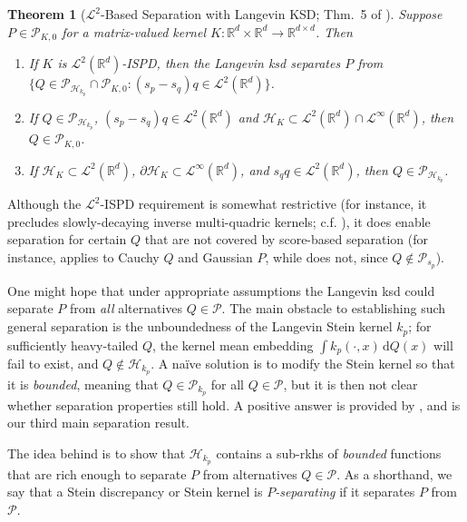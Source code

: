 \documentclass[12pt,paper=letter]{scrreprt}
\newtheorem{theorem}{Theorem}[chapter]
\begin{document}
\begin{theorem}[$\mathcal{L}^2$-Based Separation with Langevin KSD; Thm.~5 of \citealp{barp2022targeted}]
\label{thm: L2 sep}
    Suppose $P \in \mathcal{P}_{K,0}$ for a matrix-valued kernel $K : \mathbb{R}^d \times \mathbb{R}^d \rightarrow \mathbb{R}^{d \times d}$.
    Then
    \begin{enumerate}
        \item If $K$ is $\mathcal{L}^2(\mathbb{R}^d)$-ISPD, then the Langevin \ac{ksd} separates $P$ from $\{Q \in \mathcal{P}_{\mathcal{H}_{k_p}} \cap \mathcal{P}_{K,0} : (s_p - s_q) q \in \mathcal{L}^2(\mathbb{R}^d) \}$.
        \item If $Q \in \mathcal{P}_{\mathcal{H}_{k_p}}$, $(s_p - s_q) q \in \mathcal{L}^2(\mathbb{R}^d)$ and $\mathcal{H}_K \subset \mathcal{L}^2(\mathbb{R}^d) \cap \mathcal{L}^\infty(\mathbb{R}^d)$, then $Q \in \mathcal{P}_{K,0}$.
        \item If $\mathcal{H}_K \subset \mathcal{L}^2(\mathbb{R}^d)$, $\partial \mathcal{H}_K \subset \mathcal{L}^\infty(\mathbb{R}^d)$, and $s_q q \in \mathcal{L}^2(\mathbb{R}^d)$, then $Q \in \mathcal{P}_{\mathcal{H}_{k_p}}$.
    \end{enumerate}
\end{theorem}

Although the $\mathcal{L}^2$-ISPD requirement is somewhat restrictive (for instance, it precludes slowly-decaying inverse multi-quadric kernels; c.f. ), it does enable separation for certain $Q$ that are not covered by score-based separation (for instance,  applies to Cauchy $Q$ and Gaussian $P$, while  does not, since $Q \notin \mathcal{P}_{s_p}$).

One might hope that under appropriate assumptions the Langevin \ac{ksd} could separate $P$ from \emph{all} alternatives $Q \in \mathcal{P}$.
The main obstacle to establishing such general separation is the unboundedness of the Langevin Stein kernel $k_p$; for sufficiently heavy-tailed $Q$, the kernel mean embedding $\int k_p(\cdot,x) \, \mathrm{d}Q(x)$ will fail to exist, and $Q \notin \mathcal{H}_{k_p}$.
A na\"{i}ve solution is to modify the Stein kernel so that it is \emph{bounded}, meaning that $Q \in \mathcal{P}_{k_p}$ for all $Q \in \mathcal{P}$, but it is then not clear whether separation properties still hold.
A positive answer is provided by , and is our third main separation result.

The idea behind  is to show that $\mathcal{H}_{k_p}$ contains a sub-\ac{rkhs} of \emph{bounded} functions that are rich enough to separate $P$ from alternatives $Q \in \mathcal{P}$.
As a shorthand, we say that a Stein discrepancy or Stein kernel is \emph{$P$-separating} if it separates $P$ from $\mathcal{P}$.
\end{document}
